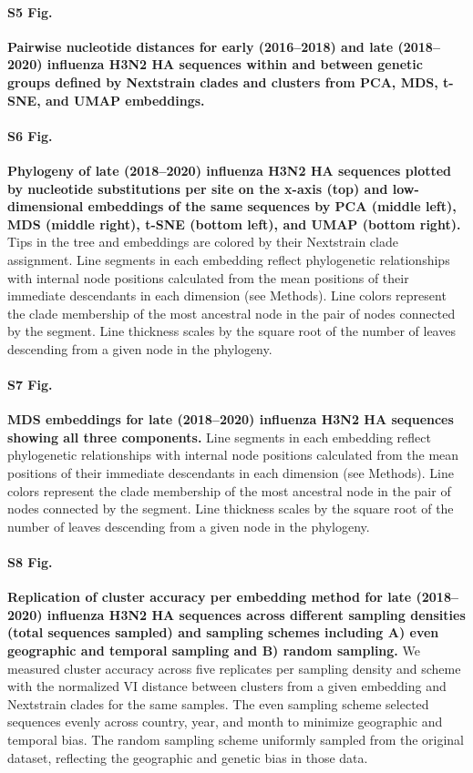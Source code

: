 \documentclass[10pt,letterpaper]{article}
\begin{document}
\paragraph*{S5 Fig.}
\label{S_Fig_flu_within_between_group_distances}
{\bf Pairwise nucleotide distances for early (2016--2018) and late (2018--2020) influenza H3N2 HA sequences within and between genetic groups defined by Nextstrain clades and clusters from PCA, MDS, t-SNE, and UMAP embeddings.}

\paragraph*{S6 Fig.}
\label{S_Fig_late_flu_embeddings_by_clade}
{\bf Phylogeny of late (2018--2020) influenza H3N2 HA sequences plotted by nucleotide substitutions per site on the x-axis (top) and low-dimensional embeddings of the same sequences by PCA (middle left), MDS (middle right), t-SNE (bottom left), and UMAP (bottom right).}
Tips in the tree and embeddings are colored by their Nextstrain clade assignment.
Line segments in each embedding reflect phylogenetic relationships with internal node positions calculated from the mean positions of their immediate descendants in each dimension (see Methods).
Line colors represent the clade membership of the most ancestral node in the pair of nodes connected by the segment.
Line thickness scales by the square root of the number of leaves descending from a given node in the phylogeny.

\paragraph*{S7 Fig.}
\label{S_Fig_late_flu_mds_embeddings}
{\bf MDS embeddings for late (2018--2020) influenza H3N2 HA sequences showing all three components.}
Line segments in each embedding reflect phylogenetic relationships with internal node positions calculated from the mean positions of their immediate descendants in each dimension (see Methods).
Line colors represent the clade membership of the most ancestral node in the pair of nodes connected by the segment.
Line thickness scales by the square root of the number of leaves descending from a given node in the phylogeny.

\paragraph*{S8 Fig.}
\label{S_Fig_late_flu_replication_of_cluster_accuracy}
{\bf Replication of cluster accuracy per embedding method for late (2018--2020) influenza H3N2 HA sequences across different sampling densities (total sequences sampled) and sampling schemes including A) even geographic and temporal sampling and B) random sampling.}
We measured cluster accuracy across five replicates per sampling density and scheme with the normalized VI distance between clusters from a given embedding and Nextstrain clades for the same samples.
The even sampling scheme selected sequences evenly across country, year, and month to minimize geographic and temporal bias.
The random sampling scheme uniformly sampled from the original dataset, reflecting the geographic and genetic bias in those data.
\end{document}
